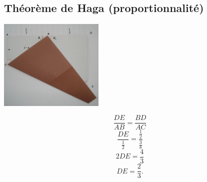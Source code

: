 \subsection{Théorème de Haga (proportionnalité)}
    \begin{multicols}{2}

    \begin{center}        
        \includegraphics[width=5cm]{haga_coupe_anote.pdf}
    \end{center}

    \begin{equation}
        \frac{ DE }{ AB }=\frac{ BD }{ AC }
    \end{equation}
    \begin{equation}
        \frac{ DE }{ \frac{ 1 }{2} }=\frac{ \frac{ 1 }{2} }{ \frac{ 3 }{ 8 } }
    \end{equation}
    \begin{equation}
        2DE=\frac{ 4 }{ 3 }
    \end{equation}
    \begin{equation}
        DE=\frac{2}{ 3 }.
    \end{equation}
    \end{multicols}
